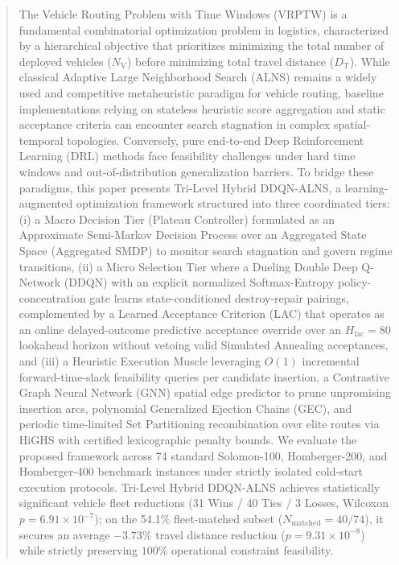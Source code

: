 \documentclass{ieeeaccess}
\newcommand{\NV}{{N_\mathrm{V}}}
\newcommand{\TD}{{D_\mathrm{T}}}
\begin{document}
\begin{abstract}
The Vehicle Routing Problem with Time Windows (VRPTW) is a fundamental combinatorial optimization problem in logistics, characterized by a hierarchical objective that prioritizes minimizing the total number of deployed vehicles ($\NV$) before minimizing total travel distance ($\TD$). While classical Adaptive Large Neighborhood Search (ALNS) remains a widely used and competitive metaheuristic paradigm for vehicle routing, baseline implementations relying on stateless heuristic score aggregation and static acceptance criteria can encounter search stagnation in complex spatial-temporal topologies. Conversely, pure end-to-end Deep Reinforcement Learning (DRL) methods face feasibility challenges under hard time windows and out-of-distribution generalization barriers. To bridge these paradigms, this paper presents Tri-Level Hybrid DDQN-ALNS, a learning-augmented optimization framework structured into three coordinated tiers: (i) a Macro Decision Tier (Plateau Controller) formulated as an Approximate Semi-Markov Decision Process over an Aggregated State Space (Aggregated SMDP) to monitor search stagnation and govern regime transitions, (ii) a Micro Selection Tier where a Dueling Double Deep Q-Network (DDQN) with an explicit normalized Softmax-Entropy policy-concentration gate learns state-conditioned destroy-repair pairings, complemented by a Learned Acceptance Criterion (LAC) that operates as an online delayed-outcome predictive acceptance override over an $H_{\text{lac}}=80$ lookahead horizon without vetoing valid Simulated Annealing acceptances, and (iii) a Heuristic Execution Muscle leveraging $O(1)$ incremental forward-time-slack feasibility queries per candidate insertion, a Contrastive Graph Neural Network (GNN) spatial edge predictor to prune unpromising insertion arcs, polynomial Generalized Ejection Chains (GEC), and periodic time-limited Set Partitioning recombination over elite routes via HiGHS with certified lexicographic penalty bounds. We evaluate the proposed framework across 74 standard Solomon-100, Homberger-200, and Homberger-400 benchmark instances under strictly isolated cold-start execution protocols. Tri-Level Hybrid DDQN-ALNS achieves statistically significant vehicle fleet reductions (31 Wins / 40 Ties / 3 Losses, Wilcoxon $p=6.91 \times 10^{-7}$); on the 54.1\% fleet-matched subset ($N_{\text{matched}}=40/74$), it secures an average $-3.73\%$ travel distance reduction ($p=9.31 \times 10^{-8}$) while strictly preserving $100\%$ operational constraint feasibility.
\end{abstract}
\end{document}
